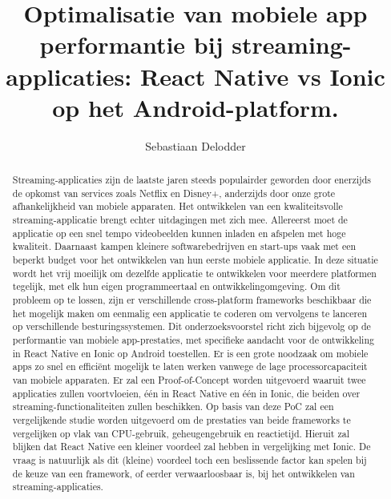 \documentclass{hogent-article}
\title{Optimalisatie van mobiele app performantie bij streaming-applicaties: React Native vs Ionic op het Android-platform.}
\author{Sebastiaan Delodder}
\begin{document}
\begin{abstract}
  Streaming-applicaties zijn de laatste jaren steeds populairder geworden door enerzijds de opkomst van services zoals Netflix en Disney+, anderzijds door onze grote afhankelijkheid van mobiele apparaten. Het ontwikkelen van een kwaliteitsvolle streaming-applicatie brengt echter uitdagingen met zich mee. Allereerst moet de applicatie op een snel tempo videobeelden kunnen inladen en afspelen met hoge kwaliteit. Daarnaast kampen kleinere softwarebedrijven en start-ups vaak met een beperkt budget voor het ontwikkelen van hun eerste mobiele applicatie. In deze situatie wordt het vrij moeilijk om dezelfde applicatie te ontwikkelen voor meerdere platformen tegelijk, met elk hun eigen programmeertaal en ontwikkelingomgeving. Om dit probleem op te lossen, zijn er verschillende cross-platform frameworks beschikbaar die het mogelijk maken om eenmalig een applicatie te coderen om vervolgens te lanceren op verschillende besturingssystemen. Dit onderzoeksvoorstel richt zich bijgevolg op de performantie van mobiele app-prestaties, met specifieke aandacht voor de ontwikkeling in React Native en Ionic op Android toestellen. Er is een grote noodzaak om mobiele apps zo snel en efficiënt mogelijk te laten werken vanwege de lage processorcapaciteit van mobiele apparaten. Er zal een Proof-of-Concept worden uitgevoerd waaruit twee applicaties zullen voortvloeien, één in React Native en één in Ionic, die beiden over streaming-functionaliteiten zullen beschikken. Op basis van deze PoC zal een vergelijkende studie worden uitgevoerd om de prestaties van beide frameworks te vergelijken op vlak van CPU-gebruik, geheugengebruik en reactietijd. Hieruit zal blijken dat React Native een kleiner voordeel zal hebben in vergelijking met Ionic. De vraag is natuurlijk als dit (kleine) voordeel toch een beslissende factor kan spelen bij de keuze van een framework, of eerder verwaarloosbaar is, bij het ontwikkelen van streaming-applicaties.
\end{abstract}

\tableofcontents



\printbibliography[heading=bibintoc]
\end{document}
